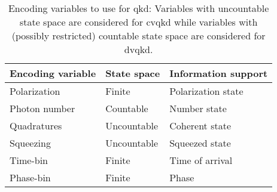\begin{table}[htb]
	\centering
	\begin{tabular}{lll}
		\toprule
		Encoding variable & State space & Information support \\
		\midrule
		Polarization & Finite & Polarization state \\
		Photon number & Countable & Number state \\
		Quadratures & Uncountable & Coherent state \\
		Squeezing & Uncountable & Squeezed state \\
		Time-bin & Finite & Time of arrival \\
		Phase-bin & Finite & Phase \\
		\bottomrule
	\end{tabular}
	\caption{Encoding variables to use for \gls{qkd}: Variables with uncountable state space are considered for \gls{cvqkd} while variables with (possibly restricted) countable state space are considered for \gls{dvqkd}.}
\end{table}

